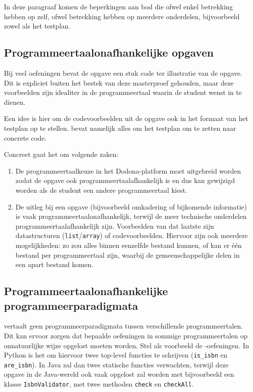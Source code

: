 In deze paragraaf komen de beperkingen aan bod die ofwel enkel betrekking hebben op \tested{} zelf, ofwel betrekking hebben op meerdere onderdelen, bijvoorbeeld zowel \tested{} als het testplan.

\subsection{Programmeertaalonafhankelijke opgaven}\label{subsec:programmeertaalonafhankelijke-opgaven}

Bij veel oefeningen bevat de opgave een stuk code ter illustratie van de opgave.
Dit is expliciet buiten het bestek van deze masterproef gehouden, maar deze voorbeelden zijn idealiter in de programmeertaal waarin de student wenst in te dienen.

Een idee is hier om de codevoorbeelden uit de opgave ook in het formaat van het testplan op te stellen.
\tested{} bevat namelijk alles om het testplan om te zetten naar concrete code.

Concreet gaat het om volgende zaken:
\begin{enumerate}
    \item De programmeertaalkeuze in het Dodona-platform moet uitgebreid worden zodat de opgave ook programmeertaalafhankelijk is en dus kan gewijzigd worden als de student een andere programmeertaal kiest.
    \item De uitleg bij een opgave (bijvoorbeeld omkadering of bijkomende informatie) is vaak programmeertaalonafhankelijk, terwijl de meer technische onderdelen programmeertaalafhankelijk zijn.
    Voorbeelden van dat laatste zijn datastructuren (\texttt{list}/\texttt{array}) of codevoorbeelden.
    Hiervoor zijn ook meerdere mogelijkheden: zo zou alles binnen eenzelfde bestand kunnen, of kan er één bestand per programmeertaal zijn, waarbij de gemeenschappelijke delen in een apart bestand komen.
\end{enumerate}

\subsection{Programmeertaalonafhankelijke programmeerparadigmata}\label{subsec:programmeertaalonafhankelijke-programmeerparadigma}

\tested{} vertaalt geen programmeerparadigmata tussen verschillende programmeertalen.
Dit kan ervoor zorgen dat bepaalde oefeningen in sommige programmeertalen op onnatuurlijke wijze opgelost moeten worden.
Stel als voorbeeld de -oefeningen.
In Python is het  om hiervoor twee top-level functies te schrijven (\texttt{is\_isbn} en \texttt{are\_isbn}).
In Java zal \tested{} dan twee statische functies verwachten, terwijl deze opgave in de Java-wereld ook vaak opgelost zal worden met bijvoorbeeld een klasse \texttt{IsbnValidator}, met twee methoden \texttt{check} en \texttt{checkAll}.

